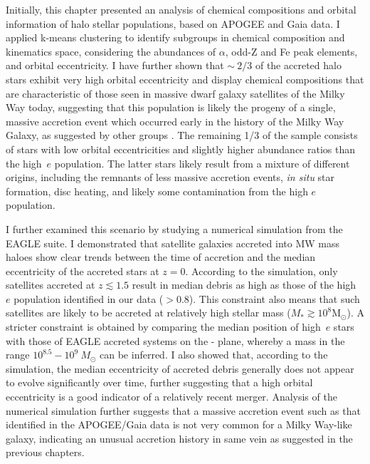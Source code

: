 Initially, this chapter presented an analysis of chemical compositions and orbital
information of halo stellar populations, based on APOGEE
and Gaia data. I applied k-means clustering to identify subgroups
in chemical composition and kinematics space, considering the
abundances of $\alpha$, odd-Z and Fe peak elements, and orbital
eccentricity.  I have further shown that $\sim~2/3$ of the accreted halo
stars exhibit very high orbital eccentricity and display chemical
compositions that are characteristic of those seen in massive dwarf
galaxy satellites of the Milky Way today, suggesting that this
population is likely the progeny of a single, massive accretion
event which occurred early in the history of the Milky Way Galaxy, as suggested by other groups
\citep[e.g.][]{2018MNRAS.475.1537M,2018arXiv180510288D,2018arXiv180606038H,2018MNRAS.478..611B}.
The remaining 1/3 of the sample consists of stars with low orbital
eccentricities and slightly higher abundance ratios than the high~$e$
population.  The latter stars likely result from a mixture of
different origins, including the remnants of less massive accretion
events, {\it in situ} star formation, disc heating, and likely some
contamination from the high $e$ population.

I further examined this scenario by studying a numerical simulation
from the EAGLE suite. I demonstrated that satellite galaxies accreted
into MW mass haloes show clear trends between the time of accretion
and the median eccentricity of the accreted stars at $z=0$.
According to the simulation, only satellites accreted at $z\lesssim
1.5$ result in median debris as high as those of the high~$e$
population identified in our data ($>0.8$). This constraint also
means that such satellites are likely to be accreted at  relatively
high stellar mass ($M_*\gtrsim 10^{8} \mathrm{M_{\odot}}$). 
A stricter constraint is obtained by comparing the median position
of high~$e$ stars with those of EAGLE accreted systems on the \mgfe{}-\feh{}
plane, whereby a mass in the range $10^{8.5}-10^9~M_\odot$ can be inferred.
I also showed that, according to the simulation, the median
eccentricity of accreted debris generally does not appear to evolve
significantly over time, further suggesting that a high orbital
eccentricity is a good indicator of a relatively recent merger.
Analysis of the numerical simulation further suggests that a massive
accretion event such as that identified in the APOGEE/Gaia data is
not very common for a Milky Way-like galaxy, indicating an unusual
accretion history in same vein as suggested in the previous
chapters.


